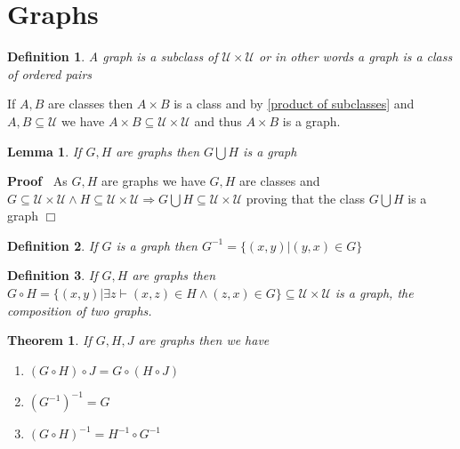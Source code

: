 \documentclass{book}
\newcommand{\nobracket}{}
\newenvironment{proof}{\noindent\textbf{Proof\ }}{\hspace*{\fill}$\Box$\medskip}
\newtheorem{definition}{Definition}
{\theorembodyfont{\rmfamily}\newtheorem{example}{Example}}
\newtheorem{lemma}{Lemma}
\newtheorem{theorem}{Theorem}
\begin{document}
{{\section{Graphs}

\begin{definition}
  A graph is a subclass of $\mathcal{U} \times \mathcal{U}$ or in other words
  a graph is a class of ordered pairs
\end{definition}

\begin{example}
  \label{product of sets is a graph}If $A, B$ are classes then $A \times B$ is
  a class and by \ref{product of subclasses} and $A, B \subseteq \mathcal{U}$
  we have $A \times B \subseteq \mathcal{U} \times \mathcal{U}$ and thus $A
  \times B$ is a graph.
\end{example}

\begin{lemma}
  If $G, H$ are graphs then $G \bigcup H$ is a graph
\end{lemma}

\begin{proof}
  As $G, H$ are graphs we have $G, H$ are classes and $G \subseteq \mathcal{U}
  \times \mathcal{U} \wedge H \subseteq \mathcal{U} \times \mathcal{U}
  \Rightarrow G \bigcup H \subseteq \mathcal{U} \times \mathcal{U}$ proving
  that the class $G \bigcup H$ is a graph
\end{proof}

\begin{definition}
  If $G$ is a graph then $G^{- 1} = \{ (x, y) | (y, x) \in G \nobracket \}$
\end{definition}

\begin{definition}
  \label{composition of graphs}If $G, H$ are graphs then $G \circ H = \{ (x,
  y) | \exists z \vdash (x, z) \in H \wedge (z, x) \in G \} \subseteq
  \mathcal{U} \times \mathcal{U}$ is a graph, the composition of two graphs.
\end{definition}

\begin{theorem}
  \label{properties of composition of mappings}If $G, H, J$ are graphs then we
  have
  \begin{enumerate}
    \item $(G \circ H) \circ J = G \circ (H \circ J)$
    
    \item $(G^{- 1})^{- 1} = G$
    
    \item $(G \circ H)^{- 1} = H^{- 1} \circ G^{- 1}$
  \end{enumerate}
\end{theorem}

}}
\end{document}
